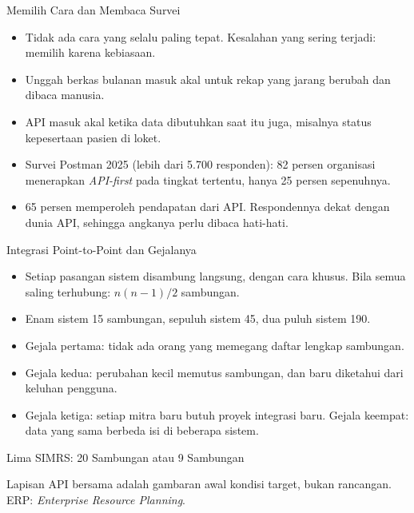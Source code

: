 \documentclass[aspectratio=169, table, 12pt]{beamer}
\begin{document}
\begin{frame}{{\Large Memilih Cara dan Membaca Survei}}
  \begin{itemize}
    \item Tidak ada cara yang selalu paling tepat. Kesalahan yang sering terjadi: memilih karena kebiasaan.
    \item Unggah berkas bulanan masuk akal untuk rekap yang jarang berubah dan dibaca manusia.
    \item API masuk akal ketika data dibutuhkan saat itu juga, misalnya status kepesertaan pasien di loket.
    \item Survei Postman 2025 (lebih dari 5.700 responden): 82 persen organisasi menerapkan \textit{API-first} pada tingkat tertentu, hanya 25 persen sepenuhnya.
    \item 65 persen memperoleh pendapatan dari API. Respondennya dekat dengan dunia API, sehingga angkanya perlu dibaca hati-hati.
  \end{itemize}
\end{frame}

\begin{frame}{{\Large Integrasi Point-to-Point dan Gejalanya}}
  \begin{itemize}
    \item Setiap pasangan sistem disambung langsung, dengan cara khusus. Bila semua saling terhubung: $n(n-1)/2$ sambungan.
    \item Enam sistem 15 sambungan, sepuluh sistem 45, dua puluh sistem 190.
    \item Gejala pertama: tidak ada orang yang memegang daftar lengkap sambungan.
    \item Gejala kedua: perubahan kecil memutus sambungan, dan baru diketahui dari keluhan pengguna.
    \item Gejala ketiga: setiap mitra baru butuh proyek integrasi baru. Gejala keempat: data yang sama berbeda isi di beberapa sistem.
  \end{itemize}
\end{frame}

\begin{frame}{{\Large Lima SIMRS: 20 Sambungan atau 9 Sambungan}}
  \centering
  \resizebox{!}{0.66\textheight}{}

  \vspace{2pt}
  {\footnotesize Lapisan API bersama adalah gambaran awal kondisi target, bukan rancangan. ERP: \textit{Enterprise Resource Planning}.\par}
\end{frame}
\end{document}
